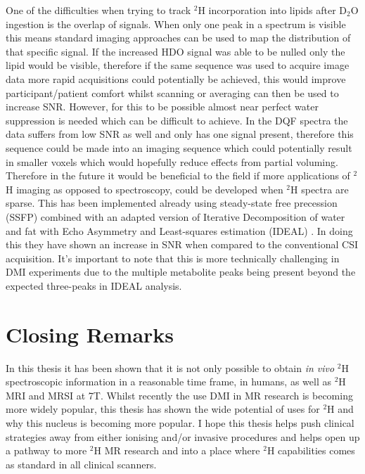 One of the difficulties when trying to track $^2$H incorporation into lipids after D$_2$O ingestion is the overlap of signals. When only one peak in a spectrum is visible this means standard imaging approaches can be used to map the distribution of that specific signal. If the increased \ac{HDO} signal was able to be nulled only the lipid would be visible, therefore if the same sequence was used to acquire image data more rapid acquisitions could potentially be achieved, this would improve participant/patient comfort whilst scanning or averaging can then be used to increase \ac{SNR}. However, for this to be possible almost near perfect water suppression is needed which can be difficult to achieve. In the \ac{DQF} spectra the data suffers from low \ac{SNR} as well and only has one signal present, therefore this sequence could be made into an imaging sequence which could potentially result in smaller voxels which would hopefully reduce effects from partial voluming. Therefore in the future it would be beneficial to the field if more applications of $^2$H imaging as opposed to spectroscopy, could be developed when $^2$H spectra are sparse. This has been implemented already using steady-state free precession (SSFP) combined with an adapted version of Iterative Decomposition of water and fat with Echo Asymmetry and Least-squares estimation (IDEAL) \cite{Peters2021ImprovingInvestigation}. In doing this they have shown an increase in \ac{SNR} when compared to the conventional \ac{CSI} acquisition. It's important to note that this is more technically challenging in \ac{DMI} experiments due to the multiple metabolite peaks being present beyond the expected three-peaks in IDEAL analysis.

\section{Closing Remarks}

In this thesis it has been shown that it is not only possible to obtain \textit{in vivo} $^2$H spectroscopic information in a reasonable time frame, in humans, as well as $^2$H \ac{MRI} and \ac{MRSI} at 7T. Whilst recently the use \ac{DMI} in MR research is becoming more widely popular, this thesis has shown the wide potential of uses for $^2$H and why this nucleus is becoming more popular. I hope this thesis helps push clinical strategies away from either ionising and/or invasive procedures and helps open up a pathway to more $^2$H MR research and into a place where $^2$H capabilities comes as standard in all clinical scanners.